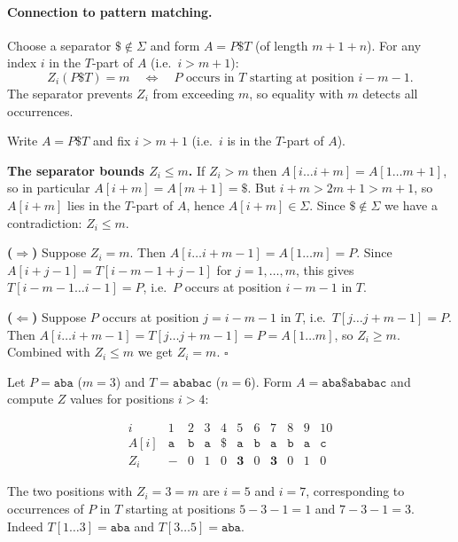 \paragraph{Connection to pattern matching.}
Choose a separator $\$\notin\Sigma$ and form $A = P\$T$ (of length $m+1+n$).
For any index $i$ in the $T$-part of $A$ (i.e.\ $i > m+1$):
\[
  Z_i(P\$T) = m
  \quad\iff\quad
  P \text{ occurs in } T \text{ starting at position } i - m - 1.
\]
The separator prevents $Z_i$ from exceeding $m$, so equality with $m$ detects all occurrences.

\begin{formaldetails}
  Write $A = P\$T$ and fix $i > m+1$ (i.e.\ $i$ is in the $T$-part of $A$).

  \smallskip
  \textbf{The separator bounds $Z_i \leq m$.}
  If $Z_i > m$ then $A[i\ldots i+m] = A[1\ldots m+1]$, so in particular
  $A[i+m] = A[m+1] = \$$.
  But $i+m > 2m+1 > m+1$, so $A[i+m]$ lies in the $T$-part of $A$, hence
  $A[i+m] \in \Sigma$.
  Since $\$ \notin \Sigma$ we have a contradiction: $Z_i \leq m$.

  \smallskip
  \textbf{($\Rightarrow$)}
  Suppose $Z_i = m$.
  Then $A[i\ldots i+m-1] = A[1\ldots m] = P$.
  Since $A[i+j-1] = T[i-m-1+j-1]$ for $j = 1,\ldots,m$, this gives
  $T[i-m-1\ldots i-1] = P$, i.e.\ $P$ occurs at position $i-m-1$ in $T$.

  \smallskip
  \textbf{($\Leftarrow$)}
  Suppose $P$ occurs at position $j = i - m - 1$ in $T$, i.e.\
  $T[j\ldots j+m-1] = P$.
  Then $A[i\ldots i+m-1] = T[j\ldots j+m-1] = P = A[1\ldots m]$,
  so $Z_i \geq m$.
  Combined with $Z_i \leq m$ we get $Z_i = m$. \hfill$\square$
\end{formaldetails}

\begin{example}
  Let $P = \texttt{aba}$ ($m=3$) and $T = \texttt{ababac}$ ($n=6$).
  Form $A = \texttt{aba\$ababac}$ and compute $Z$ values for positions $i > 4$:

  \[
    \begin{array}{c|cccccccccc}
      i     & 1 & 2 & 3 & 4 & 5 & 6 & 7 & 8 & 9 & 10 \\
      A[i]  & \texttt{a} & \texttt{b} & \texttt{a} & \texttt{\$}
            & \texttt{a} & \texttt{b} & \texttt{a} & \texttt{b} & \texttt{a} & \texttt{c} \\
      Z_i   & - & 0 & 1 & 0 & \mathbf{3} & 0 & \mathbf{3} & 0 & 1 & 0
    \end{array}
  \]

  The two positions with $Z_i = 3 = m$ are $i = 5$ and $i = 7$, corresponding
  to occurrences of $P$ in $T$ starting at positions $5-3-1=1$ and $7-3-1=3$.
  Indeed $T[1\ldots 3] = \texttt{aba}$ and $T[3\ldots 5] = \texttt{aba}$. \checkmark
\end{example}

